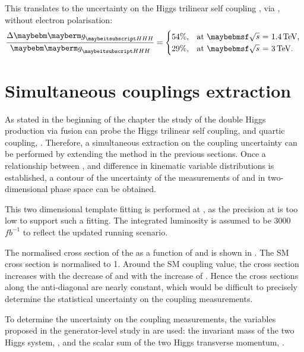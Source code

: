 This translates to the uncertainty on the Higgs trilinear self coupling \gHHH, via , without electron polarisation:
\begin{equation}
\frac{\Delta\gHHH}{\gHHH}=
\begin{cases}
  54\%, & \mbox{at \rootS{1.4}, }  \\
  29\%, & \mbox{at \rootS{3}}.
\end{cases}
\end{equation}

\section{Simultaneous couplings extraction}

As stated in the beginning of the chapter the study of the double Higgs production via \WW fusion can probe the Higgs trilinear self coupling, \gHHH and quartic coupling, \gWWHH. Therefore, a simultaneous extraction on the coupling uncertainty can be performed by extending the method in the previous sections. Once a relationship between \gHHH , \gWWHH and difference in kinematic variable distributions is established, a contour of the uncertainty of the measurements of  \gHHH and \gWWHH in two-dimensional phase space can be obtained.

This two dimensional template fitting is performed at  , as the precision at  is too low to support such a fitting. The integrated luminosity is assumed to be 3000\,$fb^{-1}$ to reflect the updated \CLIC running scenario.

The normalised cross section of the \eeToHH as a function of \gHHH and \gWWHH is shown in . The SM cross section is normalised to 1. Around the SM coupling value, the cross section increases with the decrease of \gHHH and with the increase of \gWWHH. Hence the cross sections along the anti-diagonal are nearly constant, which would be difficult to precisely determine the statistical uncertainty on the coupling measurements.



To determine the uncertainty on the coupling measurements, the variables proposed in the generator-level study in  are used: the invariant mass of the two Higgs system, \mhh, and the scalar sum of the two Higgs transverse momentum, \HT.  %

